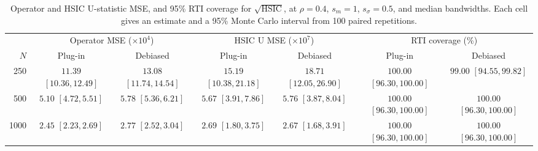 \begin{table}[htbp]
\centering\small
\caption{Operator and HSIC U-statistic MSE, and 95\% RTI coverage for $\sqrt{\mathrm{HSIC}}$, at $\rho=0.4$, $s_m=1$, $s_\sigma=0.5$, and median bandwidths. Each cell gives an estimate and a 95\% Monte Carlo interval from 100 paired repetitions.}
\label{tab:debiasing-mse-rho0p4}
\setlength{\tabcolsep}{4pt}\renewcommand{\arraystretch}{1.3}
\begin{tabular}{@{}rcccccc@{}}\toprule
& \multicolumn{2}{c}{Operator MSE ($\times 10^{4}$)} & \multicolumn{2}{c}{HSIC U MSE ($\times 10^{7}$)} & \multicolumn{2}{c}{RTI coverage (\%)}\\
\cmidrule(lr){2-3}\cmidrule(lr){4-5}\cmidrule(l){6-7}
$N$ & Plug-in & Debiased & Plug-in & Debiased & Plug-in & Debiased\\\midrule
250 & \shortstack{$11.39$\\{\scriptsize $[10.36,12.49]$}} & \shortstack{$13.08$\\{\scriptsize $[11.74,14.54]$}} & \shortstack{$15.19$\\{\scriptsize $[10.38,21.18]$}} & \shortstack{$18.71$\\{\scriptsize $[12.05,26.90]$}} & \shortstack{$100.00$\\{\scriptsize $[96.30,100.00]$}} & \shortstack{$99.00$\\{\scriptsize $[94.55,99.82]$}}\\[3pt]
500 & \shortstack{$5.10$\\{\scriptsize $[4.72,5.51]$}} & \shortstack{$5.78$\\{\scriptsize $[5.36,6.21]$}} & \shortstack{$5.67$\\{\scriptsize $[3.91,7.86]$}} & \shortstack{$5.76$\\{\scriptsize $[3.87,8.04]$}} & \shortstack{$100.00$\\{\scriptsize $[96.30,100.00]$}} & \shortstack{$100.00$\\{\scriptsize $[96.30,100.00]$}}\\[3pt]
1000 & \shortstack{$2.45$\\{\scriptsize $[2.23,2.69]$}} & \shortstack{$2.77$\\{\scriptsize $[2.52,3.04]$}} & \shortstack{$2.69$\\{\scriptsize $[1.80,3.75]$}} & \shortstack{$2.67$\\{\scriptsize $[1.68,3.91]$}} & \shortstack{$100.00$\\{\scriptsize $[96.30,100.00]$}} & \shortstack{$100.00$\\{\scriptsize $[96.30,100.00]$}}\\[3pt]
\bottomrule\end{tabular}
\end{table}
